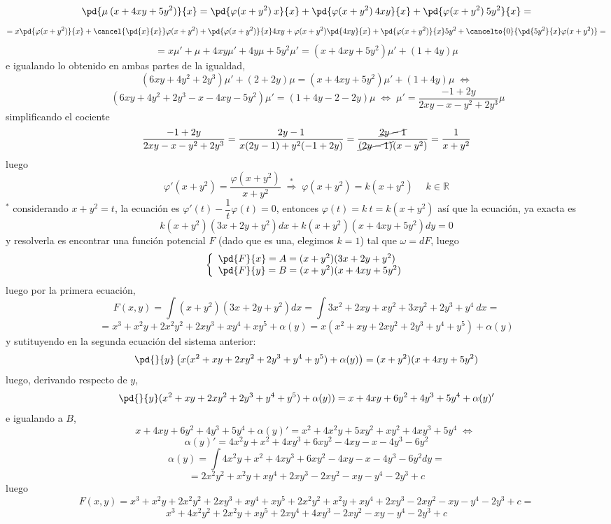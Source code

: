 \begin{enumerate}
\begin{sol}
    $$\pd{\mu \: (x+4xy+5y^2)}{x}=\pd{\varphi(x+y^2)\: x}{x}+\pd{\varphi(x+y^2)\: 4xy}{x}+\pd{\varphi(x+y^2)\: 5y^2}{x}=$$
    $$=x\pd{\varphi(x+y^2)}{x}+\cancel{\pd{x}{x}}\varphi(x+y^2) + \pd{\varphi(x+y^2)}{x} 4xy +\varphi(x+y^2) \pd{4xy}{x}+\pd{\varphi(x+y^2)}{x}5y^2+\cancelto{0}{\pd{5y^2}{x}\varphi(x+y^2)}=$$
    $$=x\mu'+\mu+4xy\mu'+4y\mu+5y^2\mu'=(x+4xy+5y^2)\mu'+(1+4y)\mu$$
    e igualando lo obtenido en ambas partes de la igualdad,
    $$(6xy+4y^2+2y^3)\mu'+(2+2y)\mu=(x+4xy+5y^2)\mu'+(1+4y)\mu \; \iff $$
    $$\; (6xy+4y^2+2y^3 - x-4xy-5y^2)\mu'=(1+4y-2-2y)\mu  \; \iff \; \mu'=\dfrac{-1+2y}{2xy-x-y^2+2y^3} \mu$$
    simplificando el cociente
    $$\dfrac{-1+2y}{2xy-x-y^2+2y^3}=\dfrac{2y-1}{x(2y-1)+y^2(-1+2y)}=\dfrac{\cancel{2y-1}}{\cancel{(2y-1)}(x-y^2)}=\dfrac{1}{x+y^2}$$
    luego 
    $$\varphi'(x+y^2)=\dfrac{\varphi(x+y^2)}{x+y^2} \; \overset{*}{\Rightarrow} \; \varphi(x+y^2)=k(x+y^2) \; \quad k \in \mathbb R$$
    $^*$ considerando $x+y^2=t$, la ecuación es $\varphi'(t)-\dfrac{1}{t}\varphi(t)=0$, entonces $\varphi(t)=k \: t=k (x+y^2)$
    así que la ecuación, ya exacta es 
    $$k (x+y^2)(3x+2y+y^2)dx+k (x+y^2)(x+4xy+5y^2)dy=0$$
    y resolverla es encontrar una función potencial $F$ (dado que es una, elegimos $k=1$) tal que $\omega=dF$, luego 
    $$\left\{ \begin{array}{l}
         \pd{F}{x}=A=(x+y^2)(3x+2y+y^2) \\
         \pd{F}{y}=B=(x+y^2)(x+4xy+5y^2) 
    \end{array}\right.$$
    luego por la primera ecuación,
    $$F(x,y)=\int (x+y^2)(3x+2y+y^2) dx=\int 3x^2+2xy+xy^2+3xy^2+2y^3+y^4 \: dx=$$
    $$=x^3+x^2y+2x^2y^2+2xy^3+xy^4+xy^5+\alpha(y)=x(x^2+xy+2xy^2+2y^3+y^4+y^5)+\alpha(y)$$
    y sutituyendo en la segunda ecuación del sistema anterior:
    $$\pd{}{y}\left(x(x^2+xy+2xy^2+2y^3+y^4+y^5)+\alpha(y)\right)=(x+y^2)(x+4xy+5y^2) $$
    luego, derivando respecto de $y$,
    $$\pd{}{y}(x^2+xy+2xy^2+2y^3+y^4+y^5)+\alpha(y))=x+4xy+6y^2+4y^3+5y^4+\alpha(y)'$$
    e igualando a $B$,
    $$x+4xy+6y^2+4y^3+5y^4+\alpha(y)'=x^2+4x^2y+5xy^2+xy^2+4xy^3+5y^4 \; \iff \; $$
    $$\alpha(y)' = 4 x^2 y + x^2 + 4 x y^3 + 6 x y^2 - 4 x y - x - 4 y^3 - 6 y^2 $$
    $$\alpha(y)=\int  4 x^2 y + x^2 + 4 x y^3 + 6 x y^2 - 4 x y - x - 4 y^3 - 6 y^2 dy =$$
    $$= 2 x^2 y^2 + x^2 y + x y^4 + 2 x y^3 - 2 x y^2 - x y - y^4 - 2 y^3 + c$$
    luego 
    $$F(x,y)=x^3+x^2y+2x^2y^2+2xy^3+xy^4+xy^5+2 x^2 y^2 + x^2 y + x y^4 + 2 x y^3 - 2 x y^2 - x y - y^4 - 2 y^3+c=$$
    $$x^3 + 4 x^2 y^2 + 2 x^2 y + x y^5 + 2 x y^4 + 4 x y^3 - 2 x y^2 - x y - y^4 - 2 y^3 + c $$

\end{sol}
\end{enumerate}
